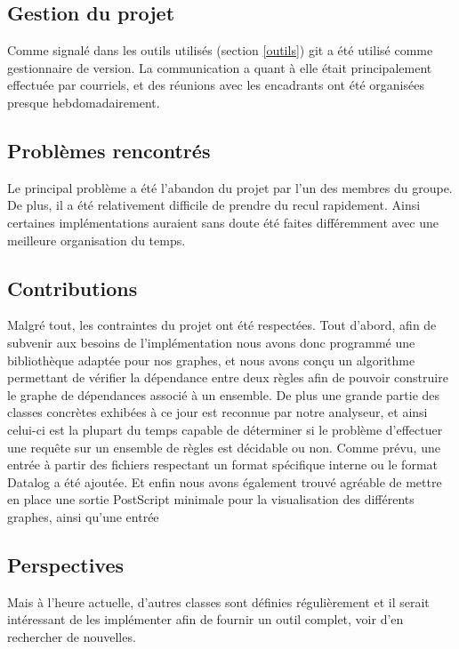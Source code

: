 
\subsection{Gestion du projet}
Comme signalé dans les outils utilisés (section \ref{outils}) git a été utilisé comme
gestionnaire de version.
La communication a quant à elle était principalement effectuée par courriels, et des
réunions avec les encadrants ont été organisées presque hebdomadairement.

\subsection{Problèmes rencontrés}
Le principal problème a été l'abandon du projet par l'un des membres du groupe. De plus,
il a été relativement difficile de prendre du recul rapidement. Ainsi certaines
implémentations auraient sans doute été faites différemment avec une meilleure
organisation du temps.

\subsection{Contributions}
Malgré tout, les contraintes du projet ont été respectées.
Tout d'abord, afin de subvenir aux besoins de l'implémentation nous avons donc programmé une
bibliothèque adaptée pour nos graphes, et nous avons conçu un algorithme permettant
de vérifier la dépendance entre deux règles afin de pouvoir construire le graphe de
dépendances associé à un ensemble.
De plus une grande partie des classes concrètes exhibées à ce
jour est reconnue par notre analyseur, et ainsi celui-ci est la plupart du temps 
capable de déterminer si
le problème d'effectuer une requête sur un ensemble de règles est décidable ou non.
Comme prévu, une entrée à partir des
fichiers respectant un format spécifique interne ou le format Datalog a été ajoutée.
Et enfin nous avons également trouvé agréable de mettre en place une sortie PostScript
minimale pour la visualisation des différents graphes, ainsi qu'une entrée 

\subsection{Perspectives}

Mais à l'heure actuelle, d'autres classes sont définies
régulièrement et il serait intéressant de les implémenter afin de fournir un outil
complet, voir d'en rechercher de nouvelles.

